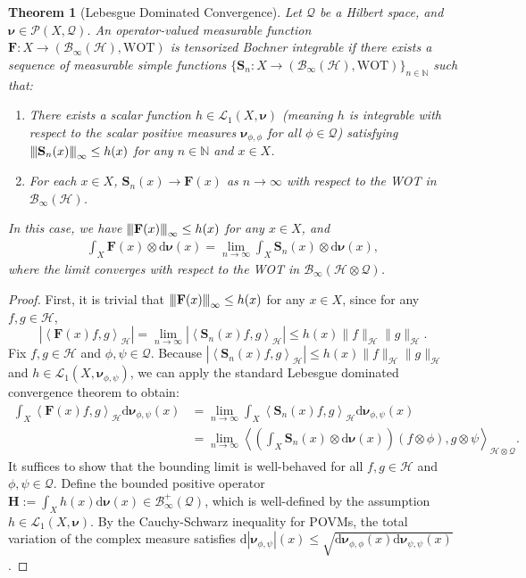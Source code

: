 \documentclass[noinfoline]{imsart}\setcounter{tocdepth}{2}
\renewcommand{\b}[1]{\mathbb{#1}} %
\newcommand{\m}[1]{\mathbf{#1}} %
\newcommand{\s}[1]{\mathscr{#1}} %
\renewcommand{\c}[1]{\mathcal{#1}} %
\newcommand{\mb}[1]{\boldsymbol{#1}} %
\newcommand{\rd}{\mathrm{d}} %
\newcommand{\vertiii}[1]{{\left\vert\kern-0.25ex\left\vert\kern-0.25ex\left\vert #1 
    \right\vert\kern-0.25ex\right\vert\kern-0.25ex\right\vert}} %
\newcommand{\innpr}[2]{{\left\langle {#1},{#2}\right\rangle}} %
\theoremstyle{plain}
\newtheorem{theorem}{Theorem}[section]
\begin{document}
\begin{appendix}
\begin{theorem}[Lebesgue Dominated Convergence]\label{thm:tens:lebesgue}
Let $\c{Q}$ be a Hilbert space, and $\mb{\nu} \in \s{P}(X, \c{Q})$. An operator-valued measurable function $\m{F}: X \to (\c{B}_{\infty}(\c{H}), \mathrm{WOT})$ is tensorized Bochner integrable if there exists a sequence of measurable simple functions $\{\m{S}_{n}: X \to (\c{B}_{\infty}(\c{H}), \mathrm{WOT}) \}_{n \in \b{N}}$ such that:
\begin{enumerate}
    \item There exists a scalar function $h \in \c{L}_{1}(X, \mb{\nu})$ (meaning $h$ is integrable with respect to the scalar positive measures $\mb{\nu}_{\phi, \phi}$ for all $\phi \in \c{Q}$) satisfying $\vertiii{\m{S}_{n}(x)}_{\infty} \le h(x)$ for any $n \in \b{N}$ and $x \in X$.
    \item For each $x \in X$, $\m{S}_{n}(x) \to \m{F}(x)$ as $n \to \infty$ with respect to the WOT in $\c{B}_{\infty}(\c{H})$.
\end{enumerate}
In this case, we have $\vertiii{\m{F}(x)}_{\infty} \le h(x)$ for any $x \in X$, and
\begin{align*}
    \int_{X} \m{F}(x) \otimes \rd \mb{\nu}(x) = \lim_{n \to \infty} \int_{X} \m{S}_{n}(x) \otimes \rd \mb{\nu}(x),
\end{align*}
where the limit converges with respect to the WOT in $\c{B}_{\infty}(\c{H} \otimes \c{Q})$.
\end{theorem}

\begin{proof}
First, it is trivial that $\vertiii{\m{F}(x)}_{\infty} \le h(x)$ for any $x \in X$, since for any $f, g \in \c{H}$,
\begin{equation*}
    |\innpr{\m{F}(x) f}{g}_{\c{H}}| = \lim_{n \to \infty} |\innpr{\m{S}_{n}(x) f}{g}_{\c{H}}| \le h(x) \|f\|_{\c{H}} \|g\|_{\c{H}}.
\end{equation*}
Fix $f, g \in \c{H}$ and $\phi, \psi \in \c{Q}$. Because $|\innpr{\m{S}_{n}(x) f}{g}_{\c{H}}| \le h(x) \|f\|_{\c{H}} \|g\|_{\c{H}}$ and $h \in \c{L}_{1}(X, \mb{\nu}_{\phi, \psi})$, we can apply the standard Lebesgue dominated convergence theorem to obtain:
\begin{align*}
    \int_{X} \innpr{\m{F}(x) f}{g}_{\c{H}} \rd \mb{\nu}_{\phi, \psi} (x) &= \lim_{n \to \infty} \int_{X} \innpr{\m{S}_{n}(x) f}{g}_{\c{H}} \rd \mb{\nu}_{\phi, \psi} (x) \\
    &= \lim_{n \to \infty} \innpr{\left( \int_{X} \m{S}_{n}(x) \otimes \rd \mb{\nu}(x) \right) (f \otimes \phi)}{g \otimes \psi}_{\c{H} \otimes \c{Q}}.
\end{align*}
It suffices to show that the bounding limit is well-behaved for all $f, g \in \c{H}$ and $\phi, \psi \in \c{Q}$. Define the bounded positive operator $\m{H} := \int_{X} h(x) \rd \mb{\nu}(x) \in \c{B}_{\infty}^{+}(\c{Q})$, which is well-defined by the assumption $h \in \c{L}_{1}(X, \mb{\nu})$. By the Cauchy-Schwarz inequality for POVMs, the total variation of the complex measure satisfies $\rd |\mb{\nu}_{\phi, \psi}|(x) \le \sqrt{\rd\mb{\nu}_{\phi, \phi}(x) \rd\mb{\nu}_{\psi, \psi}(x)}$. 


\end{proof}
\end{appendix}
\end{document}
